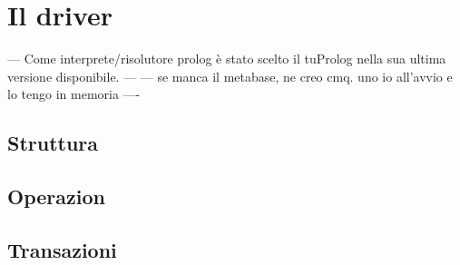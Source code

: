 \section{Il driver}

 --- Come interprete/risolutore prolog è stato scelto il tuProlog nella sua ultima versione disponibile. ---
 --- se manca il metabase, ne creo cmq. uno io all'avvio e lo tengo in memoria ---- 

\subsection{Struttura}

\subsection{Operazion}	%

\subsection{Transazioni}	%